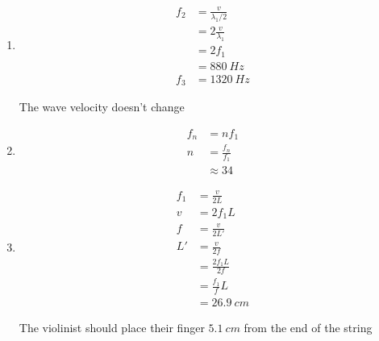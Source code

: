 \documentclass{article}
\begin{document}
\begin{enumerate}
  \item

        \begin{align*}
          f_2 & = \frac{v}{\lambda_1 / 2} \\
              & = 2 \frac{v}{\lambda_1}   \\
              & = 2 f_1                   \\
              & = \qty{880}{Hz}           \\
          f_3 & = \qty{1320}{Hz}
        \end{align*}

        The wave velocity doesn't change

  \item

        \begin{align*}
          f_n & = n f_1           \\
          n   & = \frac{f_n}{f_1} \\
              & \approx 34
        \end{align*}

  \item

        \begin{align*}
          f_1 & = \frac{v}{2 L}       \\
          v   & = 2 f_1 L             \\
          f   & = \frac{v}{2 L'}      \\
          L'  & = \frac{v}{2 f}       \\
              & = \frac{2 f_1 L}{2 f} \\
              & = \frac{f_1}{f} L     \\
              & = \qty{26.9}{cm}
        \end{align*}

        The violinist should place their finger $\qty{5.1}{cm}$ from the end of the string
\end{enumerate}

\subsection{}
\end{document}
